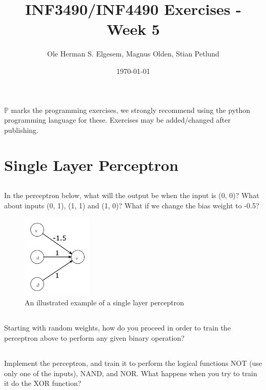 \documentclass{article}           %
\title{\vspace{-2cm}INF3490/INF4490 Exercises - Week 5}
\author{Ole Herman S. Elgesem, Magnus Olden, Stian Petlund}
\date{\today}
\newcommand\marginsymbol[1][0pt]{%
  \tabto*{0cm}\makebox[\dimexpr-1cm-#1\relax][r]{$\mathbb{P}$}\tabto*{\TabPrevPos}}
\begin{document}
    \renewcommand\marginsymbol[1][0pt]{%
  \tabto*{0cm}\makebox[-1cm][c]{$\mathbb{P}$}\tabto*{\TabPrevPos}}

\maketitle
\(\mathbb{P}\) marks the programming exercises, we strongly recommend using
the python programming language for these. Exercises may be added/changed
after publishing.

\section{Single Layer Perceptron}
\subsection{}
In the perceptron below, what will the output be when the input is (0, 0)?
What about inputs (0, 1), (1, 1) and (1, 0)?
What if we change the bias weight to -0.5?

\begin{figure}[H]
\begin{center}
\includegraphics[width=0.3\textwidth]{fig1.png}
\caption{An illustrated example of a single layer perceptron}
\label{fig:slp}
\end{center}
\end{figure}

\subsection{}
Starting with random weights, how do you proceed in order to train the
perceptron above to perform any given binary operation?
\subsection{\marginsymbol}
Implement the perceptron, and train it to perform the logical functions NOT
(use only one of the inputs), NAND, and NOR. What happens when you try to
train it do the XOR function?
\end{document}
